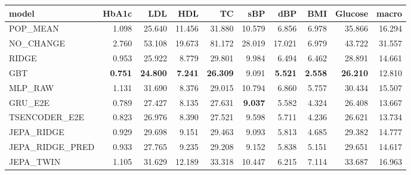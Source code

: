 \begin{tabular}{lrrrrrrrrr}
\toprule
model & HbA1c & LDL & HDL & TC & sBP & dBP & BMI & Glucose & macro \\
\midrule
POP\_MEAN & 1.098 & 25.640 & 11.456 & 31.880 & 10.579 & 6.856 & 6.978 & 35.866 & 16.294 \\
NO\_CHANGE & 2.760 & 53.108 & 19.673 & 81.172 & 28.019 & 17.021 & 6.979 & 43.722 & 31.557 \\
RIDGE & 0.953 & 25.922 & 8.779 & 29.801 & 9.984 & 6.494 & 6.462 & 28.891 & 14.661 \\
GBT & \textbf{0.751} & \textbf{24.800} & \textbf{7.241} & \textbf{26.309} & 9.091 & \textbf{5.521} & \textbf{2.558} & \textbf{26.210} & 12.810 \\
MLP\_RAW & 1.131 & 31.690 & 8.376 & 29.015 & 10.794 & 6.860 & 5.757 & 30.434 & 15.507 \\
GRU\_E2E & 0.789 & 27.427 & 8.135 & 27.631 & \textbf{9.037} & 5.582 & 4.324 & 26.408 & 13.667 \\
TSENCODER\_E2E & 0.823 & 26.976 & 8.390 & 27.521 & 9.598 & 5.711 & 4.236 & 26.621 & 13.734 \\
JEPA\_RIDGE & 0.929 & 29.698 & 9.151 & 29.463 & 9.093 & 5.813 & 4.685 & 29.382 & 14.777 \\
JEPA\_RIDGE\_PRED & 0.933 & 27.765 & 9.235 & 29.208 & 9.152 & 5.838 & 5.151 & 29.651 & 14.617 \\
JEPA\_TWIN & 1.105 & 31.629 & 12.189 & 33.318 & 10.447 & 6.215 & 7.114 & 33.687 & 16.963 \\
\bottomrule
\end{tabular}